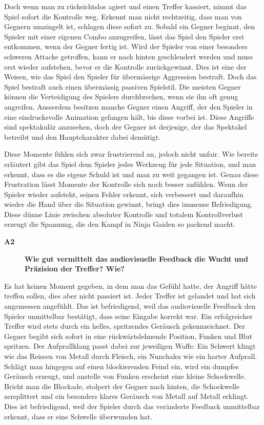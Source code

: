 \documentclass[../Main.tex]{subfiles}
\begin{document}
Doch wenn man zu rücksichtslos agiert und einen Treffer kassiert, nimmt das Spiel sofort die Kontrolle weg. Erkennt man nicht rechtzeitig, dass man von Gegnern umzingelt ist, schlagen diese sofort zu. Sobald ein Gegner beginnt, den Spieler mit einer eigenen Combo anzugreifen, lässt das Spiel den Spieler erst entkommen, wenn der Gegner fertig ist. Wird der Spieler von einer besonders schweren Attacke getroffen, kann er nach hinten geschleudert werden und muss erst wieder aufstehen, bevor er die Kontrolle zurückgewinnt. Dies ist eine der Weisen, wie das Spiel den Spieler für übermässige Aggression bestraft. Doch das Spiel bestraft auch einen übermässig passiven Spielstil. Die meisten Gegner können die Verteidigung des Spielers durchbrechen, wenn sie ihn oft genug angreifen. Ausserdem besitzen manche Gegner einen Angriff, der den Spieler in eine eindrucksvolle Animation gefangen hält, bis diese vorbei ist. Diese Angriffe sind spektakulär anzusehen, doch der Gegner ist derjenige, der das Spektakel betreibt und den Hauptcharakter dabei demütigt.

Diese Momente fühlen sich zwar frustrierend an, jedoch nicht unfair. Wie bereits erläutert gibt das Spiel dem Spieler jedes Werkzeug für jede Situation, und man erkennt, dass es die eigene Schuld ist und man zu weit gegangen ist. Genau diese Frustration lässt Momente der Kontrolle sich noch besser anfühlen. Wenn der Spieler wieder aufsteht, seinen Fehler erkennt, sich verbessert und daraufhin wieder die Hand über die Situation gewinnt, bringt dies immense Befriedigung. Diese dünne Linie zwischen absoluter Kontrolle und totalem Kontrollverlust erzeugt die Spannung, die den Kampf in Ninja Gaiden so packend macht.

\begin{description}
  \item[\textbf{A2}] \textbf{Wie gut vermittelt das audiovisuelle Feedback die Wucht und Präzision der Treffer? Wie?}
\end{description}

Es hat keinen Moment gegeben, in dem man das Gefühl hatte, der Angriff hätte treffen sollen, dies aber nicht passiert ist. Jeder Treffer ist gelandet und hat sich angemessen angefühlt. Das ist befriedigend, weil das audiovisuelle Feedback den Spieler unmittelbar bestätigt, dass seine Eingabe korrekt war. Ein erfolgreicher Treffer wird stets durch ein helles, spritzendes Geräusch gekennzeichnet. Der Gegner begibt sich sofort in eine rückwärtslehnende Position, Funken und Blut spritzen. Der Aufprallklang passt dabei zur jeweiligen Waffe: Ein Schwert klingt wie das Reissen von Metall durch Fleisch, ein Nunchaku wie ein harter Aufprall. Schlägt man hingegen auf einen blockierenden Feind ein, wird ein dumpfes Geräusch erzeugt, und anstelle von Funken erscheint eine kleine Schockwelle. Bricht man die Blockade, stolpert der Gegner nach hinten, die Schockwelle zersplittert und ein besonders klares Geräusch von Metall auf Metall erklingt. Dies ist befriedigend, weil der Spieler durch das veränderte Feedback unmittelbar erkennt, dass er eine Schwelle überwunden hat.
\end{document}
